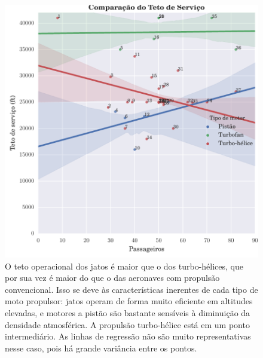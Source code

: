 \begin{figure}
\centering
\includegraphics{../autogenerated/graficos_comparativos/teto.pdf}
\caption[Comparação do teto operacional]{
O teto operacional dos jatos é maior que o dos turbo-hélices, que por sua vez é maior do que o das aeronaves com propulsão convencional.
Isso se deve às características inerentes de cada tipo de moto propulsor: jatos operam de forma muito eficiente em altitudes elevadas, e motores a pistão são bastante sensíveis à diminuição da densidade atmosférica.
A propulsão turbo-hélice está em um ponto intermediário. As linhas de regressão não são muito representativas nesse caso, pois há grande variância entre os pontos.
}
\label{fig:teto}
\end{figure}

